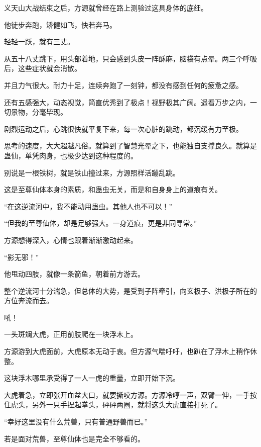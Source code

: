 
\begin{this_body}



义天山大战结束之后，方源就曾经在路上测验过这具身体的底细。

他徒步奔跑，矫健如飞，快若奔马。

轻轻一跃，就有三丈。

从五十八丈跳下，用头部着地，只会感到头皮一阵酥麻，脑袋有点晕。两三个呼吸后，这些症状就会消散。

并且力气很大。耐力十足，连续奔跑了一刻钟，都没有感到任何的疲惫之感。

还有五感强大，动态视觉，简直优秀到了极点！视野极其广阔。遥看万步之内，一切景物，分毫毕现。

剧烈运动之后，心跳很快就平复下来，每一次心脏的跳动，都沉缓有力至极。

思考的速度，大大超越凡俗。就算到了智慧光晕之下，也能独自支撑良久。就算是蛊仙，单凭肉身，也极少达到这种程度的。

别说是一根铁树，就是铁山撞过来，方源照样活蹦乱跳。

这是至尊仙体本身的素质，和蛊虫无关，而是和自身身上的道痕有关。

“在这逆流河中，我不能动用蛊虫。其他人也不可以！”

“但我的至尊仙体，却是足够强大。一身道痕，更是非同寻常。”

方源想得深入，心情也跟着渐渐激动起来。

“影无邪！”

他甩动四肢，就像一条箭鱼，朝着前方游去。

整个逆流河十分湍急，但总体的大势，是受到子阵牵引，向玄极子、洪极子所在的方位奔流而去。

吼！

一头斑斓大虎，正用前肢爬在一块浮木上。

方源游到大虎面前，大虎原本无动于衷。但方源气喘吁吁，也趴在了浮木上稍作休整。

这块浮木哪里承受得了一人一虎的重量，立即开始下沉。

大虎着急，立即张开血盆大口，就要撕咬方源。方源冷哼一声，双臂一伸，一手按住虎头，另外一只手捏起拳头，砰砰两圈，就将这头大虎直接打死了。

“幸好这里没有什么荒兽，只有普通野兽而已。”

若是面对荒兽，至尊仙体也是完全不够看的。


\end{this_body}
